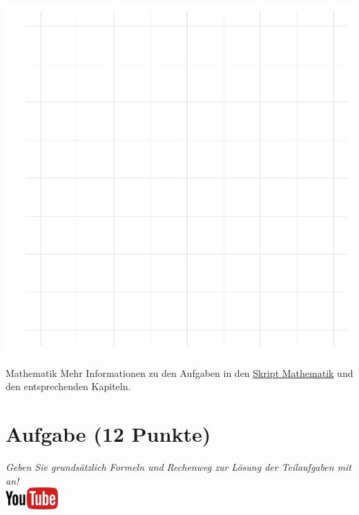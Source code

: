 \documentclass[a4paper, 9pt]{scrartcl}\usepackage[]{graphicx}\usepackage[]{xcolor}
\makeatletter
\def\maxwidth{ %
  \ifdim\Gin@nat@width>\linewidth
    \linewidth
  \else
    \Gin@nat@width
  \fi
}
\makeatother
\begin{document}
{\centering \includegraphics[width=\maxwidth]{img/modeling-R-01-1} 

}


 
\clearpage
\begin{graybox}{Mathematik}
Mehr Informationen zu den Aufgaben in den \href{https://jkruppa.github.io/math/}{Skript Mathematik} und den entsprechenden Kapiteln.\\
\end{graybox}
\clearpage

\section{Aufgabe \hfill (12 Punkte)}

\textit{Geben Sie grunds{\"a}tzlich Formeln und Rechenweg zur L{\"o}sung der
  Teilaufgaben mit an!} \\[1Ex]

\hfill\href{https://youtu.be/Fu8kN0Uj13Y}{\includegraphics[width =
  2cm]{img/youtube}} %
\hspace{2Ex}
\end{document}
